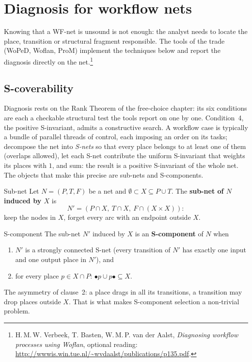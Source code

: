 \section{Diagnosis for workflow nets}

Knowing that a WF-net is unsound is not enough: the analyst needs to locate the place, transition or structural fragment responsible. The tools of the trade (WoPeD, Woflan, ProM) implement the techniques below and report the diagnosis directly on the net.\footnote{H.\,M.\,W. Verbeek, T. Basten, W.\,M.\,P. van der Aalst, \emph{Diagnosing workflow processes using Woflan}, optional reading: \url{http://wwwis.win.tue.nl/~wvdaalst/publications/p135.pdf}.}

\subsection{S-coverability}

Diagnosis rests on the Rank Theorem of the free-choice chapter: its six conditions are each a checkable structural test the tools report on one by one. Condition~4, the positive S-invariant, admits a constructive search. A workflow case is typically a bundle of parallel threads of control, each imposing an order on its tasks; decompose the net into \emph{S-nets} so that every place belongs to at least one of them (overlaps allowed), let each S-net contribute the uniform S-invariant that weights its places with $1$, and sum: the result is a positive S-invariant of the whole net. The objects that make this precise are sub-nets and S-components.

\begin{definitionbox}{Sub-net}
Let $N = (P, T, F)$ be a net and $\emptyset \subset X \subseteq P \cup T$. The \textbf{sub-net of $N$ induced by $X$} is
\[N' = (P \cap X,\ T \cap X,\ F \cap (X \times X)):\]
keep the nodes in $X$, forget every arc with an endpoint outside $X$.
\end{definitionbox}
\begin{definitionbox}{S-component}
The sub-net $N'$ induced by $X$ is an \textbf{S-component} of $N$ when
\begin{enumerate}
  \item $N'$ is a strongly connected S-net (every transition of $N'$ has exactly one input and one output place in $N'$), and
  \item for every place $p \in X \cap P$: $\bullet p \cup p \bullet \subseteq X$.
\end{enumerate}
\end{definitionbox}
The asymmetry of clause~2: a place drags in all its transitions, a transition may drop places outside $X$. That is what makes S-component selection a non-trivial problem.

